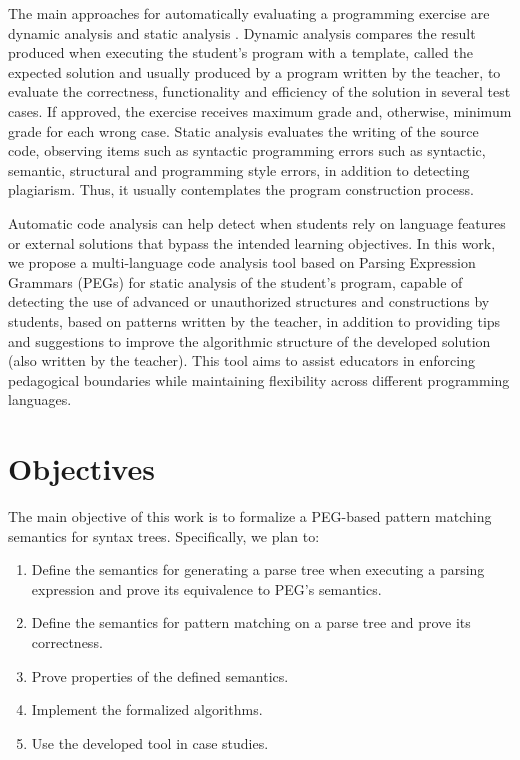 The main approaches for automatically evaluating a programming exercise are 
dynamic analysis and static analysis \cite{oliveira2015-avaliacao-automatica-programacao}. 
Dynamic analysis compares the result produced when executing the student's 
program with a template, called the expected solution and usually produced by a 
program written by the teacher, to evaluate the correctness, functionality and 
efficiency of the solution in several test cases. If approved, the exercise 
receives maximum grade and, otherwise, minimum grade for each wrong case. Static 
analysis evaluates the writing of the source code, observing items such as syntactic 
programming errors such as syntactic, semantic, structural and programming style 
errors, in addition to detecting plagiarism. Thus, it usually contemplates the 
program construction process.

Automatic code analysis can help detect when students rely on language 
features or external solutions that bypass the intended learning objectives.
In this work, we propose a multi-language code analysis tool based on Parsing 
Expression Grammars (PEGs) for static analysis of the student's program, 
capable of detecting the use of advanced or unauthorized structures and 
constructions by students, based on patterns written by the teacher, in addition 
to providing tips and suggestions to improve the algorithmic structure of the 
developed solution (also written by the teacher). This tool aims to assist 
educators in enforcing pedagogical boundaries while maintaining flexibility 
across different programming languages.

\section{Objectives}\label{sec:objectives}

The main objective of this work is to formalize a PEG-based pattern matching 
semantics for syntax trees. Specifically, we plan to:
\begin{enumerate}
    \item Define the semantics for generating a parse tree when executing a parsing expression
            and prove its equivalence to PEG's semantics.
    \item Define the semantics for pattern matching on a parse tree and prove its correctness.
    \item Prove properties of the defined semantics.
    \item Implement the formalized algorithms.
    \item Use the developed tool in case studies.
\end{enumerate}

